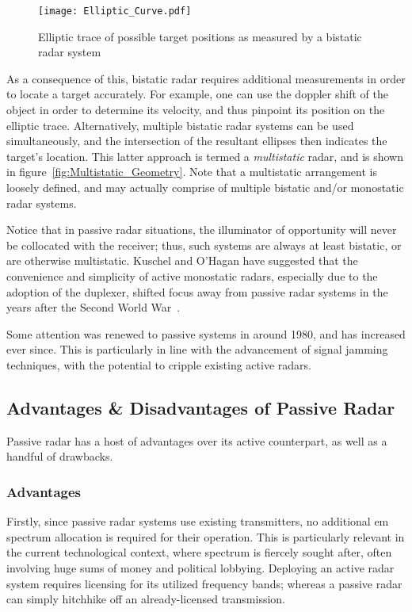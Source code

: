 \documentclass[class=report,11pt,crop=false]{standalone}
\begin{document}
\begin{figure}
    \centering
    \texttt{[image: Elliptic\_Curve.pdf]}
    \caption{Elliptic trace of possible target positions as measured by a bistatic radar system}
    \label{fig:Elliptic_Curve}
\end{figure}

As a consequence of this, bistatic radar requires additional measurements in order to locate a target accurately. For example, one can use the doppler shift of the object in order to determine its velocity, and thus pinpoint its position on the elliptic trace. Alternatively, multiple bistatic radar systems can be used simultaneously, and the intersection of the resultant ellipses then indicates the target's location. This latter approach is termed a \emph{multistatic} radar, and is shown in figure~\ref{fig:Multistatic_Geometry}. Note that a multistatic arrangement is loosely defined, and may actually comprise of multiple bistatic and/or monostatic radar systems.

Notice that in passive radar situations, the illuminator of opportunity will never be collocated with the receiver; thus, such systems are always at least bistatic, or are otherwise multistatic. Kuschel and O'Hagan have suggested that the convenience and simplicity of active monostatic radars, especially due to the adoption of the duplexer, shifted focus away from passive radar systems in the years after the Second World War~\cite{kuschel-hagan-history}.

Some attention was renewed to passive systems in around 1980, and has increased ever since. This is particularly in line with the advancement of signal jamming techniques, with the potential to cripple existing active radars.

\subsection{Advantages \& Disadvantages of Passive Radar}
Passive radar has a host of advantages over its active counterpart, as well as a handful of drawbacks.

\subsubsection{Advantages}
Firstly, since passive radar systems use existing transmitters, no additional \gls{em} spectrum allocation is required for their operation. This is particularly relevant in the current technological context, where spectrum is fiercely sought after, often involving huge sums of money and political lobbying. Deploying an active radar system requires licensing for its utilized frequency bands; whereas a passive radar can simply hitchhike off an already-licensed transmission.
\end{document}
